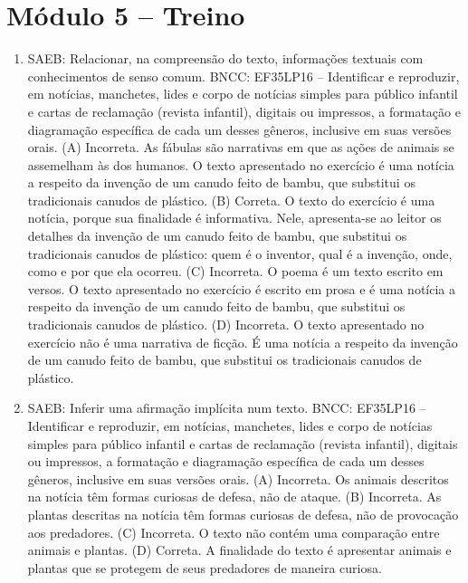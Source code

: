\section*{Módulo 5 – Treino}

\begin{enumerate}
\item
SAEB: Relacionar, na compreensão do texto, informações textuais com
conhecimentos de senso comum.
BNCC: EF35LP16 -- Identificar e reproduzir, em notícias, manchetes, lides
e corpo de notícias simples para público infantil e cartas de reclamação
(revista infantil), digitais ou impressos, a formatação e diagramação
específica de cada um desses gêneros, inclusive em suas versões orais.
(A) Incorreta. As fábulas são narrativas em que as ações de animais se 
assemelham às dos humanos. O texto apresentado no exercício é uma notícia 
a respeito da invenção de um canudo feito de bambu, que substitui os 
tradicionais canudos de plástico.  
(B) Correta. O texto do exercício é uma notícia, porque sua finalidade é
informativa. Nele, apresenta-se ao leitor os detalhes da invenção de um 
canudo feito de bambu, que substitui os tradicionais canudos de plástico:
quem é o inventor, qual é a invenção, onde, como e por que ela ocorreu.
(C) Incorreta. O poema é um texto escrito em versos. O texto apresentado 
no exercício é escrito em prosa e é uma notícia a respeito da invenção de
um canudo feito de bambu, que substitui os tradicionais canudos de 
plástico.   
(D) Incorreta. O texto apresentado no exercício não é uma narrativa de 
ficção. É uma notícia a respeito da invenção de um canudo feito de bambu,
que substitui os tradicionais canudos de plástico.

\item
SAEB: Inferir uma afirmação implícita num texto.
BNCC: EF35LP16 -- Identificar e reproduzir, em notícias, manchetes, lides
e corpo de notícias simples para público infantil e cartas de reclamação
(revista infantil), digitais ou impressos, a formatação e diagramação
específica de cada um desses gêneros, inclusive em suas versões orais.
(A) Incorreta. Os animais descritos na notícia têm formas curiosas de 
defesa, não de ataque. 
(B) Incorreta. As plantas descritas na notícia têm formas curiosas de 
defesa, não de provocação aos predadores. 
(C) Incorreta. O texto não contém uma comparação entre animais e plantas.  
(D) Correta. A finalidade do texto é apresentar animais e plantas que se 
protegem de seus predadores de maneira curiosa.


\end{enumerate}

